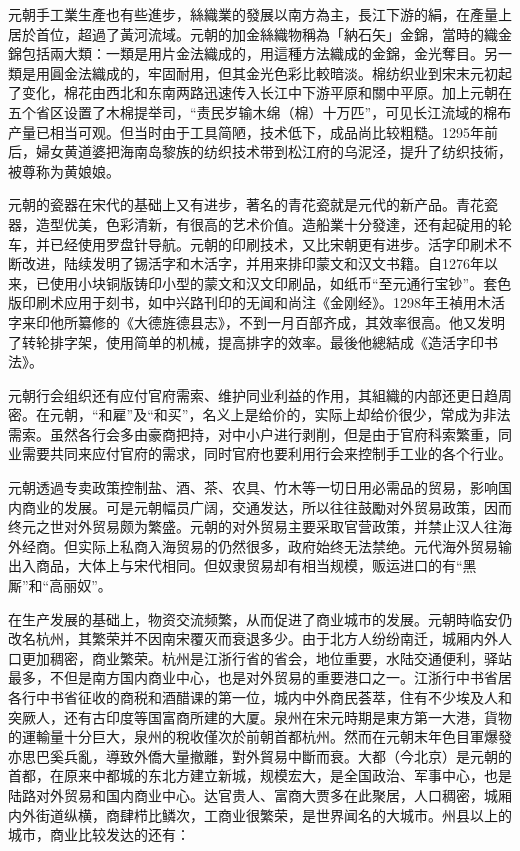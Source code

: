 元朝手工業生產也有些進步，絲織業的發展以南方為主，長江下游的絹，在產量上居於首位，超過了黃河流域。元朝的加金絲織物稱為「納石矢」金錦，當時的織金錦包括兩大類：一類是用片金法織成的，用這種方法織成的金錦，金光奪目。另一類是用圓金法織成的，牢固耐用，但其金光色彩比較暗淡。棉纺织业到宋末元初起了变化，棉花由西北和东南两路迅速传入长江中下游平原和關中平原。加上元朝在五个省区设置了木棉提举司，“责民岁输木绵（棉）十万匹”，可见长江流域的棉布产量已相当可观。但当时由于工具简陋，技术低下，成品尚比较粗糙。1295年前后，婦女黄道婆把海南岛黎族的纺织技术带到松江府的乌泥泾，提升了纺织技術，被尊称为黄娘娘。

元朝的瓷器在宋代的基础上又有进步，著名的青花瓷就是元代的新产品。青花瓷器，造型优美，色彩清新，有很高的艺术价值。造船業十分發達，还有起碇用的轮车，并已经使用罗盘针导航。元朝的印刷技术，又比宋朝更有进步。活字印刷术不断改进，陆续发明了锡活字和木活字，并用来排印蒙文和汉文书籍。自1276年以来，已使用小块铜版铸印小型的蒙文和汉文印刷品，如纸币“至元通行宝钞”。套色版印刷术应用于刻书，如中兴路刊印的无闻和尚注《金刚经》。1298年王禎用木活字来印他所纂修的《大德旌德县志》，不到一月百部齐成，其效率很高。他又发明了转轮排字架，使用简单的机械，提高排字的效率。最後他總結成《造活字印书法》。

元朝行会组织还有应付官府需索、维护同业利益的作用，其組織的内部还更日趋周密。在元朝，“和雇”及“和买”，名义上是给价的，实际上却给价很少，常成为非法需索。虽然各行会多由豪商把持，对中小户进行剥削，但是由于官府科索繁重，同业需要共同来应付官府的需求，同时官府也要利用行会来控制手工业的各个行业。

元朝透過专卖政策控制盐、酒、茶、农具、竹木等一切日用必需品的贸易，影响国内商业的发展。可是元朝幅员广阔，交通发达，所以往往鼓勵对外贸易政策，因而终元之世对外贸易颇为繁盛。元朝的对外贸易主要采取官营政策，并禁止汉人往海外经商。但实际上私商入海贸易的仍然很多，政府始终无法禁绝。元代海外贸易输出入商品，大体上与宋代相同。但奴隶贸易却有相当规模，贩运进口的有“黑厮”和“高丽奴”。

在生产发展的基础上，物资交流频繁，从而促进了商业城市的发展。元朝時临安仍改名杭州，其繁荣并不因南宋覆灭而衰退多少。由于北方人纷纷南迁，城厢内外人口更加稠密，商业繁荣。杭州是江浙行省的省会，地位重要，水陆交通便利，驿站最多，不但是南方国内商业中心，也是对外贸易的重要港口之一。江浙行中书省居各行中书省征收的商税和酒醋课的第一位，城内中外商民荟萃，住有不少埃及人和突厥人，还有古印度等国富商所建的大厦。泉州在宋元時期是東方第一大港，貨物的運輸量十分巨大，泉州的稅收僅次於前朝首都杭州。然而在元朝末年色目軍爆發亦思巴奚兵亂，導致外僑大量撤離，對外貿易中斷而衰。大都（今北京）是元朝的首都，在原来中都城的东北方建立新城，规模宏大，是全国政治、军事中心，也是陆路对外贸易和国内商业中心。达官贵人、富商大贾多在此聚居，人口稠密，城厢内外街道纵横，商肆栉比鳞次，工商业很繁荣，是世界闻名的大城市。州县以上的城市，商业比较发达的还有：

